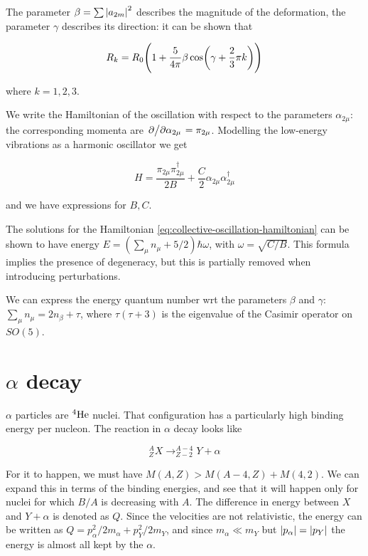 \documentclass{article}
\begin{document}
The parameter \(\beta = \sum  \abs{a_{2m}}^2  \) describes the magnitude of the deformation, the parameter \(\gamma\) describes its direction: it can be shown that

\begin{equation}
    R_k = R_0 \qty(1+\frac{5}{4 \pi} \beta \cos(\gamma + \frac{2}{3} \pi k) )
\end{equation}

where \(k = 1, 2, 3\).

We write the Hamiltonian of the oscillation with respect to the parameters \(\alpha_{2\mu}\): the corresponding momenta are \(\pdv*{}{\alpha_{2\mu}} = \pi_{2\mu}\). Modelling the low-energy vibrations as a harmonic oscillator we get

\begin{equation} \label{eq:collective-oscillation-hamiltonian}
    H = \frac{\pi_{2\mu} \pi_{2\mu}^\dag}{2B} + \frac{C}{2} \alpha_{2\mu} \alpha_{2\mu}^\dag
\end{equation}

and we have expressions for \(B, C\).

The solutions for the Hamiltonian \eqref{eq:collective-oscillation-hamiltonian} can be shown to have energy \(E = (\sum_\mu n_\mu + 5/2) \hbar \omega\), with \(\omega = \sqrt{C/B}\). This formula implies the presence of degeneracy, but this is partially removed when introducing perturbations.

We can express the energy quantum number wrt the parameters \(\beta\) and \(\gamma\): \(\sum _{\mu}  n_\mu = 2n_\beta + \tau \), where \(\tau (\tau+3)\) is the eigenvalue of the Casimir operator on \(SO(5)\).

\section{\(\alpha\) decay}

\(\alpha\) particles are \(^{4} \ce{He} \) nuclei. That configuration has a particularly high binding energy per nucleon. The reaction in \(\alpha\) decay looks like

\begin{equation}
    ^{A} _Z X \rightarrow ^{A-4} _{Z-2} Y + \alpha
\end{equation}

For it to happen, we must have \(M(A, Z) > M(A-4, Z) + M(4, 2)\). We can expand this in terms of the binding energies, and see that it will happen only for nuclei for which \(B/A\) is decreasing with \(A\). The difference in energy between \(X\) and \(Y + \alpha\) is denoted as \(Q\). Since the velocities are not relativistic, the energy can be written as \(Q = p_\alpha^2 /2m_\alpha + p_Y^2 /2m_Y\), and since \(m_\alpha \ll m_Y\) but \(\abs{p_\alpha} = \abs{p_Y}\) the energy is almost all kept by the \(\alpha\).
\end{document}
